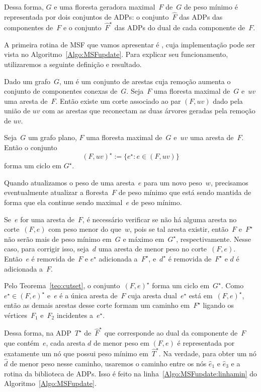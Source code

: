 Dessa forma, $G$ e uma floresta geradora maximal~$F$ de~$G$ de peso mínimo é representada por dois conjuntos de ADPs: o conjunto~$\hat F$ das ADPs das componentes de~$F$ e o conjunto~$\hat F^\star$ das ADPs do dual de cada componente de~$F$.

A primeira rotina de MSF que vamos apresentar é \MSFupdate{}, cuja implementação pode ser vista no Algoritmo~\ref{Algo:MSFupdate}.
Para explicar seu funcionamento, utilizaremos a seguinte definição e resultado.

Dado um grafo~$G$, um  é um conjunto de arestas cuja remoção aumenta o conjunto de componentes conexas de~$G$.
Seja~$F$ uma floresta maximal de~$G$ e~$uv$ uma aresta de~$F$.
Então existe um corte associado ao par $(F, uv)$ dado pela união de $uv$ com as arestas que reconectam as duas árvores geradas pela remoção de $uv$.

\begin{theorem}
\label{teo:cutset}
Seja~$G$ um grafo plano, $F$ uma floresta maximal de~$G$ e~$uv$ uma aresta de~$F$.
Então o conjunto
$$
(F, uv)^\star := \{e^\star:e\in (F, uv)\}
$$
forma um ciclo em $G^\star$.
\end{theorem}

Quando atualizamos o peso de uma aresta~$e$ para um novo peso~$w$, precisamos eventualmente atualizar a floresta~$F$ de peso mínimo que está sendo mantida de forma que ela continue sendo maximal~$e$ de peso mínimo.

Se~$e$ for uma aresta de~$F$, é necessário verificar se não há alguma aresta no corte~$(F, e)$ com peso menor do que~$w$, pois se tal aresta existir, então~$F$ e~$F^\star$ não serão mais de peso mínimo em~$G$ e máximo em~$G^\star$, respectivamente.
Nesse caso, para corrigir isso, seja~$d$ uma aresta de menor peso no corte~$(F, e)$.
Então~$e$ é removida de~$F$ e $e^\star$ adicionada a~$F^\star$, e~$d^\star$ é removida de~$F^\star$ e $d$ é adicionada a~$F$.

Pelo Teorema~\ref{teo:cutset}, o conjunto~$(F, e)^\star$ forma um ciclo em~$G^\star$.
Como~$e^\star \in (F, e)^\star$ e~$e$ é a única aresta de~$F$ cuja aresta dual~$e^\star$ está em~$(F, e)^\star$, então as demais arestas desse corte formam um caminho em~$F^\star$ ligando os vértices~$F_1$ e~$F_2$ incidentes a~$e^\star$.

Dessa forma, na ADP~$T^\star$ de~$\hat F^\star$ que corresponde ao dual da componente de~$F$ que contém~$e$, cada aresta $d$ de menor peso em $(F, e)$ é representada por exatamente um nó que possui peso mínimo em~$\hat T^\star$.
Na verdade, para obter um nó $\hat d$ de menor peso nesse caminho, usaremos o caminho entre os nós $\hat e_1$ e $\hat e_3$ e a rotina \LCOMin{} da biblioteca de ADPs.
Isso é feito na linha~\ref{Algo:MSFupdate:linhamin} do Algoritmo~\ref{Algo:MSFupdate}.

